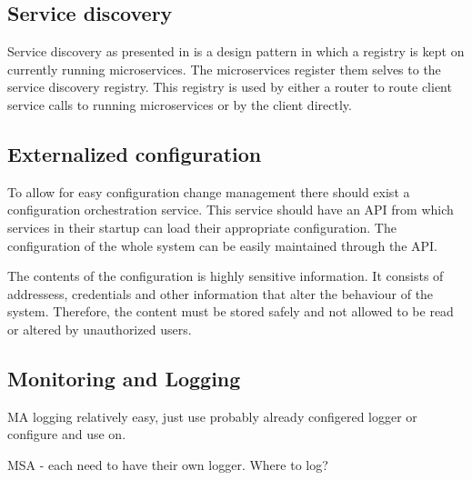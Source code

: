 \subsection{Service discovery}
\begin{sloppypar}
    Service discovery as presented in \citet{DBLP:journals/corr/MontesiW16} is a 
    design pattern in which a registry is kept on currently running microservices. 
    The microservices register them selves to the service discovery registry. 
    This registry is used by either a router to route client service calls to 
    running microservices or by the client directly.
\end{sloppypar}



\subsection{Externalized configuration}
\begin{sloppypar}
    To allow for easy configuration change management there should exist a 
    configuration orchestration service. This service should have an API from 
    which services in their startup can load their appropriate configuration. 
    The configuration of the whole system can be easily maintained through the 
    API.
\end{sloppypar}
\begin{sloppypar}
    The contents of the configuration is highly sensitive information. It 
    consists of addressess, credentials and other information that alter 
    the behaviour of the system. Therefore, the content must be stored safely 
    and not allowed to be read or altered by unauthorized users.
\end{sloppypar}



\subsection{Monitoring and Logging}
\begin{sloppypar}
    MA logging relatively easy, just use probably already configered logger or configure and use on.
\end{sloppypar}
\begin{sloppypar}
    MSA - each need to have their own logger. Where to log? 
\end{sloppypar}


